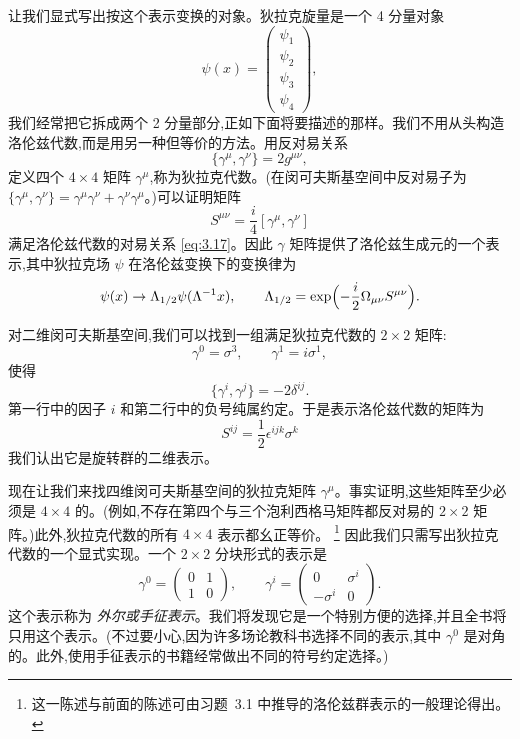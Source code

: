 让我们显式写出按这个表示变换的对象。狄拉克旋量是一个 4 分量对象
\begin{equation}
  \psi(x) = \begin{pmatrix}\psi_1\\ \psi_2\\ \psi_3\\ \psi_4\end{pmatrix},
\end{equation}
我们经常把它拆成两个 2 分量部分,正如下面将要描述的那样。我们不用从头构造洛伦兹代数,而是用另一种但等价的方法。用反对易关系
\begin{equation}
  \{\gamma^\mu, \gamma^\nu\} = 2g^{\mu\nu},
  \label{eq:3.22b}
\end{equation}
定义四个 $4\times4$ 矩阵 $\gamma^\mu$,称为狄拉克代数。(在闵可夫斯基空间中反对易子为 $\{\gamma^\mu,\gamma^\nu\} = \gamma^\mu\gamma^\nu + \gamma^\nu\gamma^\mu$。)可以证明矩阵
\begin{equation}
  S^{\mu\nu} = \frac{i}{4}[\gamma^\mu, \gamma^\nu]
  \label{eq:3.23}
\end{equation}
满足洛伦兹代数的对易关系 \eqref{eq:3.17}。因此 $\gamma$ 矩阵提供了洛伦兹生成元的一个表示,其中狄拉克场 $\psi$ 在洛伦兹变换下的变换律为
\begin{equation}
  \psi(x) \to \Lambda_{1/2}\psi(\Lambda^{-1}x),
  \qquad \Lambda_{1/2} = \exp\Bigl(
    -\frac{i}{2}\Omega_{\mu\nu}S^{\mu\nu}\Bigr).
  \label{eq:3.24}
\end{equation}

对二维闵可夫斯基空间,我们可以找到一组满足狄拉克代数的 $2\times2$ 矩阵:
\begin{equation}
  \gamma^0 = \sigma^3,\qquad \gamma^1 = i\sigma^1,
\end{equation}
使得
\begin{equation}
  \{\gamma^i, \gamma^j\} = -2\delta^{ij}.
  \label{eq:3.24b}
\end{equation}
第一行中的因子 $i$ 和第二行中的负号纯属约定。于是表示洛伦兹代数的矩阵为
\begin{equation}
  S^{ij} = \frac{1}{2}\epsilon^{ijk}\sigma^k
  \label{eq:3.25}
\end{equation}
我们认出它是旋转群的二维表示。

现在让我们来找四维闵可夫斯基空间的狄拉克矩阵 $\gamma^\mu$。事实证明,这些矩阵至少必须是 $4\times4$ 的。(例如,不存在第四个与三个泡利西格马矩阵都反对易的 $2\times2$ 矩阵。)此外,狄拉克代数的所有 $4\times4$ 表示都幺正等价。%
\footnote{这一陈述与前面的陈述可由习题~3.1 中推导的洛伦兹群表示的一般理论得出。} 因此我们只需写出狄拉克代数的一个显式实现。一个 $2\times2$ 分块形式的表示是
\begin{equation}
  \gamma^0 = \begin{pmatrix}0&1\\1&0\end{pmatrix},\qquad
  \gamma^i = \begin{pmatrix}0&\sigma^i\\ -\sigma^i&0\end{pmatrix}.
  \label{eq:3.26}
\end{equation}
这个表示称为 \emph{外尔或手征表示}。我们将发现它是一个特别方便的选择,并且全书将只用这个表示。(不过要小心,因为许多场论教科书选择不同的表示,其中 $\gamma^0$ 是对角的。此外,使用手征表示的书籍经常做出不同的符号约定选择。)


